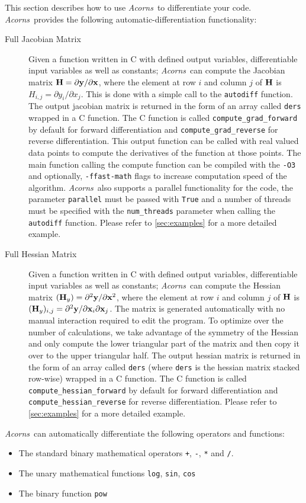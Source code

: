 \documentclass[a4,oneside]{book}
\def\codesize{\small}
\def\x{\ensuremath{{\bf x}}}
\def\y{\ensuremath{{\bf y}}}
\def\H{\ensuremath{{\bf H}}}
\def\Acorns{\emph{Acorns}}
\def\code#1{{\codesize\texttt{#1}}}
\begin{document}
This section describes how to use \Acorns\ to differentiate your code. \Acorns\ provides the following automatic-differentiation functionality:
%
\begin{description}
\item[Full Jacobian Matrix] Given a function written in C with defined output variables, differentiable input variables as well as constants; \Acorns\ can compute the Jacobian matrix $\H=\partial\y/\partial\x$, where the element at row $i$ and column $j$ of $\H$ is $H_{i,j}=\partial y_i/\partial x_j$. 
This is done with a simple call to the \code{autodiff} function. The output jacobian matrix is returned in the form of an array called \code{ders} wrapped in a C function. The C function is called \code{compute\_grad\_forward} by default for forward differentiation and \code{compute\_grad\_reverse} for reverse differentiation. This output function can be called with real valued data points to compute the derivatives of the function at those points. The main function calling the compute function can be compiled with the \code{-O3} and optionally, \code{-ffast-math} flags to increase computation speed of the algorithm. \Acorns\ also supports a parallel functionality for the code, the parameter \code{parallel} must be passed with \code{True} and a number of threads must be specified with the \code{num\_threads} parameter when calling the \code{autodiff} function. Please refer to \ref{sec:examples} for a more detailed example.

\item[Full Hessian Matrix] Given a function written in C with defined output variables, differentiable input variables as well as constants; \Acorns\ can compute the Hessian matrix $(\H_y)=\partial^2\y/\partial\x^2$, where the element at row $i$ and column $j$ of $\H$ is $(\H_y)_{i,j}=\partial^2\y/\partial\x_i\partial\x_j$. The matrix is generated automatically with no manual interaction required to edit the program. To optimize over the number of calculations, we take advantage of the symmetry of the Hessian and only compute the lower triangular part of the matrix and then copy it over to the upper triangular half. The output hessian matrix is returned in the form of an array called \code{ders} (where \code{ders} is the hessian matrix stacked row-wise) wrapped in a C function.  The C function is called \code{compute\_hessian\_forward} by default for forward differentiation and \code{compute\_hessian\_reverse} for reverse differentiation. Please refer to \ref{sec:examples} for a more detailed example.
\end{description}%
%
\Acorns\ can automatically differentiate the following
operators and functions:
\begin{itemize}
\item The standard binary mathematical operators \code{+}, \code{-},
  \code{*} and \code{/}.
\item The unary mathematical functions  \code{log}, \code{sin}, \code{cos}
\item The binary function \code{pow}
\end{itemize}
\end{document}
